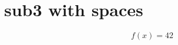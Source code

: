 \section{sub3 with spaces}\label{sec:sub3 with spaces}

\begin{equation}
  f(x) = 42
  \label{eq:sub3 with spaces}
\end{equation}
